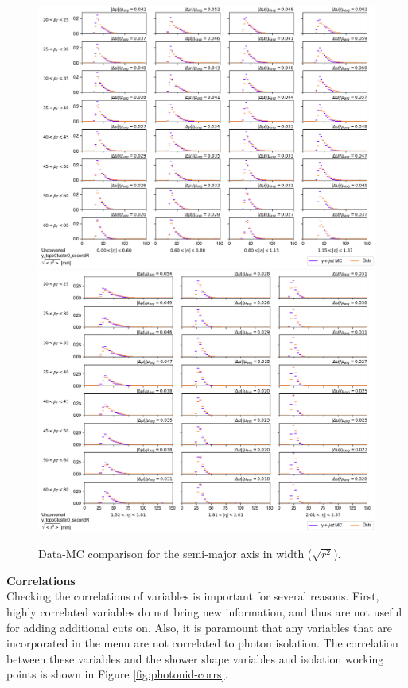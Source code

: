 \begin{figure}[!thp]
    \centering
    \includegraphics[width=.80\textwidth]{chapters/chapter4_photonID/images/y_topoCluster0_secondR_Unconverted_lowerEta.png}
    \includegraphics[width=.80\textwidth]{chapters/chapter4_photonID/images/y_topoCluster0_secondR_Unconverted_upperEta.png}
    \caption{Data-MC comparison for the semi-major axis in width ($\sqrt{r^2}$).}
\end{figure}

\noindent\textbf{Correlations}\\
\indent Checking the correlations of variables is important for several reasons. First, highly correlated variables do not bring new information, and thus are not useful for adding additional cuts on. Also, it is paramount that any variables that are incorporated in the menu are not correlated to photon isolation. The correlation between these variables and the shower shape variables and isolation working points is shown in Figure \ref{fig:photonid-corrs}. 


